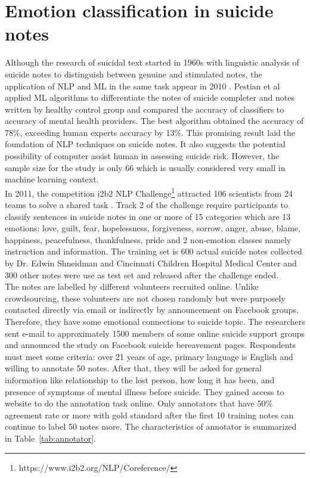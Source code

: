 \section{Emotion classification in suicide notes}
Although the research of suicidal text started in 1960s with linguistic analysis of suicide notes to distinguish between genuine and stimulated notes, the application of NLP and ML in the same task appear in 2010 \cite{Desmet2013}. Pestian et al \cite{Pestian2010} applied ML algorithms to differentiate the notes of suicide completer and notes written by healthy control group and compared the accuracy of classifiers to accuracy of mental health providers. The best algorithm obtained the accuracy of 78\%, exceeding human experts accuracy by 13\%. This promising result laid the foundation of NLP techniques on suicide notes. It also suggests the potential possibility of computer assist human in assessing suicide risk. However, the sample size for the study is only 66 which is usually considered very small in machine learning context.\\
In 2011, the competition i2b2 NLP Challenge\footnote{https://www.i2b2.org/NLP/Coreference/} attracted 106 scientists from 24 teams to solve a shared task \cite{Pestian2012}. Track 2 of the challenge require participants to classify sentences in suicide notes in one or more of 15 categories which are 13 emotions: love, guilt, fear, hopelessness, forgiveness, sorrow, anger, abuse, blame, happiness, peacefulness, thankfulness, pride  and 2 non-emotion classes namely instruction and information. The training set is 600 actual suicide notes collected by Dr. Edwin Shneidman and Cincinnati Children Hospital Medical Center and 300 other notes were use as test set and released after the challenge ended.\\
The notes are labelled by different volunteers recruited online. Unlike crowdsourcing, these volunteers are not chosen randomly but were purposely contacted directly via email or indirectly by announcement on Facebook groups. Therefore, they have some emotional connections to suicide topic. The researchers sent e-mail to approximately 1500 members of some online suicide support groups and announced the study on Facebook suicide bereavement pages. Respondents must meet some criteria: over 21 years of age, primary language is English and willing to annotate 50 notes. After that, they will be asked for general information like relationship to the lost person, how long it has been, and presence of symptoms of mental illness before suicide. They gained access to website to do the annotation task online. Only annotators that have 50\% agreement rate or more with gold standard after the first 10 training notes can continue to label 50 notes more. The characteristics of annotator is summarized in Table~\ref{tab:annotator}.\\
